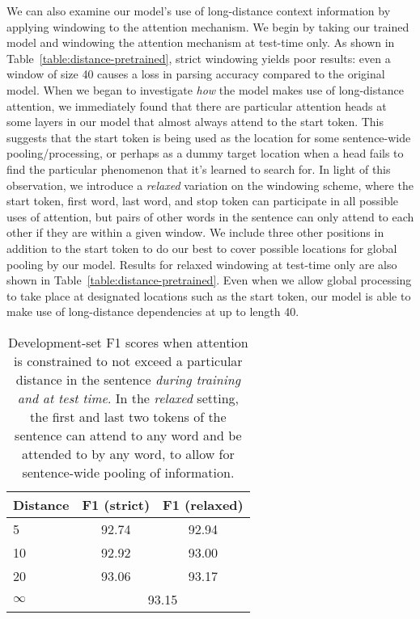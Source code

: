 \documentclass[11pt,a4paper]{article}
\begin{document}
We can also examine our model's use of long-distance context information by applying windowing to the attention mechanism. We begin by taking our trained model and windowing the attention mechanism at test-time only. As shown in Table~\ref{table:distance-pretrained}, strict windowing yields poor results: even a window of size 40 causes a loss in parsing accuracy compared to the original model. When we began to investigate \emph{how} the model makes use of long-distance attention, we immediately found that there are particular attention heads at some layers in our model that almost always attend to the start token. This suggests that the start token is being used as the location for some sentence-wide pooling/processing, or perhaps as a dummy target location when a head fails to find the particular phenomenon that it's learned to search for. In light of this observation, we introduce a \emph{relaxed} variation on the windowing scheme, where the start token, first word, last word, and stop token can participate in all possible uses of attention, but pairs of other words in the sentence can only attend to each other if they are within a given window. We include three other positions in addition to the start token to do our best to cover possible locations for global pooling by our model. Results for relaxed windowing at test-time only are also shown in Table~\ref{table:distance-pretrained}. Even when we allow global processing to take place at designated locations such as the start token, our model is able to make use of long-distance dependencies at up to length 40.

\begin{table}[t!]
\begin{center}
\begin{tabular}{@{}lcc@{}}
\toprule
Distance & \phantom{a}F1 (strict)\phantom{a} & F1 (relaxed) \\
\midrule
5  & 92.74 & 92.94 \\
10 & 92.92 & 93.00 \\
20 & 93.06 & 93.17 \\
$\infty$ & \multicolumn{2}{c}{93.15} \\
\bottomrule
\end{tabular}
\end{center}
\caption{
\label{table:distance-newtrained}
Development-set F1 scores when attention is constrained to not exceed a particular distance in the sentence \emph{during training and at test time}. In the \emph{relaxed} setting, the first and last two tokens of the sentence can attend to any word and be attended to by any word, to allow for sentence-wide pooling of information.
}
\end{table}
\end{document}
